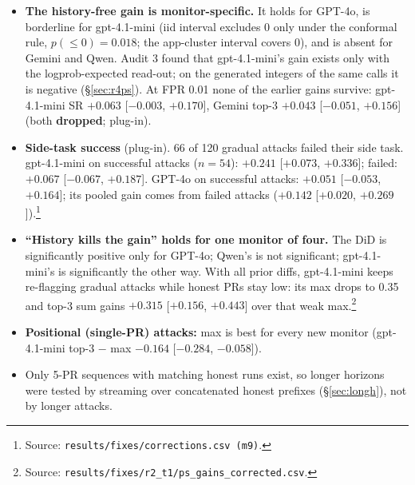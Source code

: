\documentclass[11pt]{article}
\newcommand{\m}{\ensuremath{-}}
\newcommand{\src}[1]{\footnote{Source: \nolinkurl{#1}.}}
\newcommand{\vdrop}{\textcolor{BrickRed}{\textbf{dropped}}}
\begin{document}
\begin{itemize}
\item \textbf{The history-free gain is monitor-specific.} It holds for GPT-4o, is borderline for gpt-4.1-mini (iid interval excludes 0 only under the conformal rule, $p(\le0)=0.018$; the app-cluster interval covers 0), and is absent for Gemini and Qwen. Audit 3 found that gpt-4.1-mini's gain exists only with the logprob-expected read-out; on the generated integers of the same calls it is negative (\S\ref{sec:r4ps}). At FPR 0.01 none of the earlier gains survive: gpt-4.1-mini SR $+0.063$ [$\m0.003$, $+0.170$], Gemini top-3 $+0.043$ [$\m0.051$, $+0.156$] (both \vdrop; plug-in).
\item \textbf{Side-task success} (plug-in). 66 of 120 gradual attacks failed their side task. gpt-4.1-mini on successful attacks ($n=54$): $+0.241$ [$+0.073$, $+0.336$]; failed: $+0.067$ [$\m0.067$, $+0.187$]. GPT-4o on successful attacks: $+0.051$ [$\m0.053$, $+0.164$]; its pooled gain comes from failed attacks ($+0.142$ [$+0.020$, $+0.269$]).\src{results/fixes/corrections.csv (m9)}
\item \textbf{``History kills the gain'' holds for one monitor of four.} The DiD is significantly positive only for GPT-4o; Qwen's is not significant; gpt-4.1-mini's is significantly the other way. With all prior diffs, gpt-4.1-mini keeps re-flagging gradual attacks while honest PRs stay low: its max drops to 0.35 and top-3 sum gains $+0.315$ [$+0.156$, $+0.443$] over that weak max.\src{results/fixes/r2_t1/ps_gains_corrected.csv}
\item \textbf{Positional (single-PR) attacks:} max is best for every new monitor (gpt-4.1-mini top-3 $-$ max $\m0.164$ [$\m0.284$, $\m0.058$]).
\item Only 5-PR sequences with matching honest runs exist, so longer horizons were tested by streaming over concatenated honest prefixes (\S\ref{sec:longh}), not by longer attacks.
\end{itemize}
\end{document}
